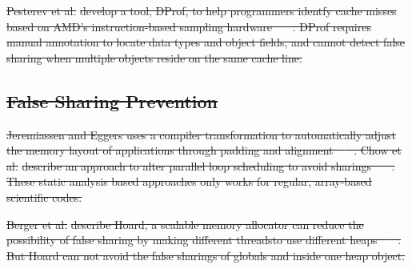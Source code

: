 \documentclass[10pt]{sigplanconf}
\providecommand{\DIFdel}[1]{{\protect\color{red}\sout{#1}}}                      %
\begin{document}
\DIFdel{Pesterev et al.}%
\DIFdel{develop a tool, DProf, to help programmers identfy cache misses based on
AMD's instruction-based sampling hardware~\mbox{%
\cite{DProf}
}%
.
DProf requires manual annotation
to locate data types and object fields, and cannot detect false
sharing when multiple objects reside on the same cache line.
}%

\subsection{\DIFdel{False Sharing Prevention}}
\addtocounter{subsection}{-1}%
\DIFdel{Jeremiassen and Eggers uses a compiler transformation to automatically adjust the
memory layout of applications through padding and alignment~\mbox{%
\cite{falseshare:compile}
}%
.
Chow et al.}%
\DIFdel{describe an approach to alter parallel loop scheduling to avoid
sharings~\mbox{%
\cite{falseshare:schedule}
}%
.
These static analysis based approaches only works for regular,
array-based scientific codes.
}%

\DIFdel{Berger et al.}%
\DIFdel{describe Hoard, a scalable memory allocator can reduce
the possibility of false sharing
by making different 
threadsto use different heaps~\mbox{%
\cite{Hoard}
}%
. But Hoard can not avoid the false sharings of globals and inside one heap object.
}%

\end{document}
